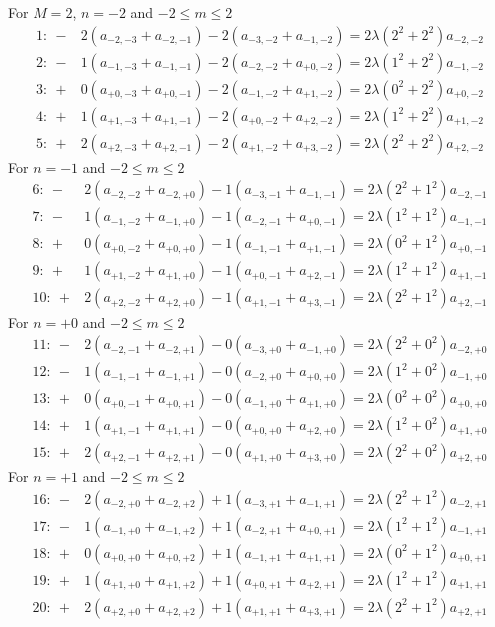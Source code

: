 \documentclass{article}
\newcommand{\0}{\mathbf{0}}
\newcommand{\1}{\mathbf{1}}
\newcommand{\2}{\mathbf{2}}
\newcommand{\3}{\mathbf{3}}
\newcommand{\4}{\mathbf{4}}
\newcommand{\5}{\mathbf{5}}
\newcommand{\6}{\mathbf{6}}
\newcommand{\7}{\mathbf{7}}
\newcommand{\8}{\mathbf{8}}
\begin{document}
For $M=2$, $n=-2$ and $-2\leq m\leq2$
%
\begin{align*}
 1:\ -&2(a_{-2,-3}+a_{-2,-1})  -2(a_{-3,-2}+a_{-1,-2})=2\lambda(2^2+2^2)a_{-2,-2}\\
 2:\ -&1(a_{-1,-3}+a_{-1,-1})  -2(a_{-2,-2}+a_{+0,-2})=2\lambda(1^2+2^2)a_{-1,-2}\\
 3:\ +&0(a_{+0,-3} +a_{+0,-1}) -2(a_{-1,-2}+a_{+1,-2})=2\lambda(0^2+2^2)a_{+0,-2}\\
 4:\ +&1(a_{+1,-3} +a_{+1,-1}) -2(a_{+0,-2}+a_{+2,-2})=2\lambda(1^2+2^2)a_{+1,-2}\\
 5:\ +&2(a_{+2,-3} +a_{+2,-1}) -2(a_{+1,-2}+a_{+3,-2})=2\lambda(2^2+2^2)a_{+2,-2}
\end{align*}
%
For $n=-1$ and $-2\leq m\leq2$
%
\begin{align*}
 6:\ -&2(a_{-2,-2}+a_{-2,+0})  -1(a_{-3,-1}+a_{-1,-1})=2\lambda(2^2+1^2)a_{-2,-1}\\
 7:\ -&1(a_{-1,-2}+a_{-1,+0})  -1(a_{-2,-1}+a_{+0,-1})=2\lambda(1^2+1^2)a_{-1,-1}\\
 8:\ +&0(a_{+0,-2}+a_{+0,+0}) -1(a_{-1,-1}+a_{+1,-1})=2\lambda(0^2+1^2)a_{+0,-1}\\
 9:\ +&1(a_{+1,-2}+a_{+1,+0}) -1(a_{+0,-1}+a_{+2,-1})=2\lambda(1^2+1^2)a_{+1,-1}\\
 10:\ +&2(a_{+2,-2}+a_{+2,+0}) -1(a_{+1,-1}+a_{+3,-1})=2\lambda(2^2+1^2)a_{+2,-1}
\end{align*}
%
For $n=+0$ and $-2\leq m\leq2$
%
\begin{align*}
 11:\ -&2(a_{-2,-1}+a_{-2,+1})  -0(a_{-3,+0}+a_{-1,+0})=2\lambda(2^2+0^2)a_{-2,+0}\\
 12:\ -&1(a_{-1,-1}+a_{-1,+1})  -0(a_{-2,+0}+a_{+0,+0})=2\lambda(1^2+0^2)a_{-1,+0}\\
 13:\ +&0(a_{+0,-1}+a_{+0,+1}) -0(a_{-1,+0}+a_{+1,+0})=2\lambda(0^2+0^2)a_{+0,+0}\\
 14:\ +&1(a_{+1,-1}+a_{+1,+1}) -0(a_{+0,+0}+a_{+2,+0})=2\lambda(1^2+0^2)a_{+1,+0}\\
 15:\ +&2(a_{+2,-1}+a_{+2,+1}) -0(a_{+1,+0}+a_{+3,+0})=2\lambda(2^2+0^2)a_{+2,+0}
\end{align*}
%
For $n=+1$ and $-2\leq m\leq2$
%
\begin{align*}
16:\  -&2(a_{-2,+0}+a_{-2,+2})  +1(a_{-3,+1}+a_{-1,+1})=2\lambda(2^2+1^2)a_{-2,+1}\\
17:\  -&1(a_{-1,+0}+a_{-1,+2})  +1(a_{-2,+1}+a_{+0,+1})=2\lambda(1^2+1^2)a_{-1,+1}\\
18:\  +&0(a_{+0,+0}+a_{+0,+2}) +1(a_{-1,+1}+a_{+1,+1})=2\lambda(0^2+1^2)a_{+0,+1}\\
19:\  +&1(a_{+1,+0}+a_{+1,+2}) +1(a_{+0,+1}+a_{+2,+1})=2\lambda(1^2+1^2)a_{+1,+1}\\
20:\  +&2(a_{+2,+0}+a_{+2,+2}) +1(a_{+1,+1}+a_{+3,+1})=2\lambda(2^2+1^2)a_{+2,+1}
\end{align*}
\end{document}
